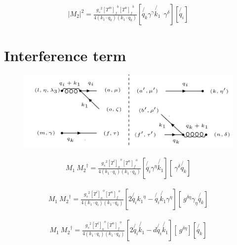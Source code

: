 \begin{equation}
\begin{split}
|M_2|^2=\frac{{g_s}^2 {[T^m]_f}^b {[T^n]_{f}}^{b}}{4(k_1 \cdot q_k)(k_1\cdot q_k)}[\not{q_k}{\gamma}^{\gamma}\not{k_1}\:\: {\gamma}^{{\delta}}][\not{q_i}]
\end{split}
\end{equation}

\pagebreak

\section{Interference term}
\begin{figure}[ht!]
\centering
\includegraphics[scale=0.7]{images/QG/M1M2Dagger.png}
\end{figure}


\begin{equation}
\begin{split}
M_1\: {M_2}^{\dagger}=\frac{{g_s}^2 {[T^l]_a}^o {[T^n]_{f}}^{o}}{4(k_1 \cdot q_i)(k_1 \cdot q_k)}[\not{q_i}{\gamma}^{\eta}\not{k_1}][\: {\gamma}^{{\delta}}\not{q_k}]
\end{split}
\end{equation}

\begin{equation}
\begin{split}
M_1\: {M_2}^{\dagger}=\frac{{g_s}^2 {[T^l]_a}^o {[T^n]_{f}}^{o}}{4(k_1\cdot q_i)(k_1 \cdot q_k)}[2\not{q_i}{k_1}^{\eta}-\not{q_i}\not{k_1}{\gamma}^{{\eta}}][\: g^{\delta \eta}{\gamma}_{{\eta}}\not{q_k}]
\end{split}
\end{equation}

\begin{equation}
\begin{split}
M_1\: {M_2}^{\dagger}=\frac{{g_s}^2 {[T^l]_a}^o {[T^n]_{f}}^{o}}{4(k_1\cdot q_i)(k_1 \cdot q_k)}[2\not{q_i}\not{k_1}-d\not{q_i}\not{k_1}][\: g^{\delta \eta}][\not{q_k}]
\end{split}
\end{equation}

